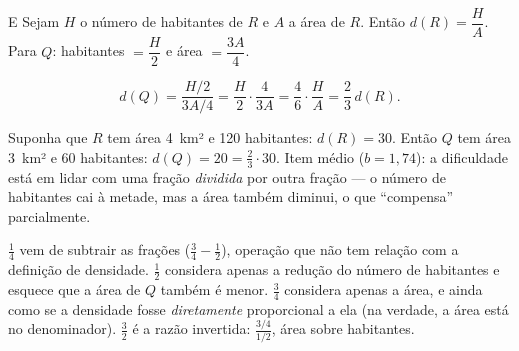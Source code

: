 \begin{resolucao}{E}
 Sejam $H$ o número de habitantes de $R$ e $A$ a
área de $R$. Então $d(R) = \dfrac{H}{A}$. Para $Q$: habitantes $=\dfrac{H}{2}$ e área
$=\dfrac{3A}{4}$.

\[
d(Q) = \frac{H/2}{3A/4} = \frac{H}{2} \cdot \frac{4}{3A} = \frac{4}{6} \cdot \frac{H}{A} = \frac{2}{3}\,d(R).
\]

 Suponha que $R$ tem
área 4~km² e 120 habitantes: $d(R) = 30$. Então $Q$ tem área 3~km² e 60 habitantes:
$d(Q) = 20 = \frac{2}{3} \cdot 30$. Item médio ($b = 1{,}74$): a dificuldade está em
lidar com uma fração \emph{dividida} por outra fração — o número de habitantes cai à
metade, mas a área também diminui, o que ``compensa'' parcialmente.
\begin{distratores}
 $\frac{1}{4}$ vem de subtrair as frações ($\frac{3}{4} - \frac{1}{2}$), operação
que não tem relação com a definição de densidade.
 $\frac{1}{2}$ considera apenas a redução do número de habitantes e esquece que a
área de $Q$ também é menor.
 $\frac{3}{4}$ considera apenas a área, e ainda como se a densidade fosse
\emph{diretamente} proporcional a ela (na verdade, a área está no denominador).
 $\frac{3}{2}$ é a razão invertida: $\frac{3/4}{1/2}$, área sobre habitantes.
\end{distratores}
\end{resolucao}

